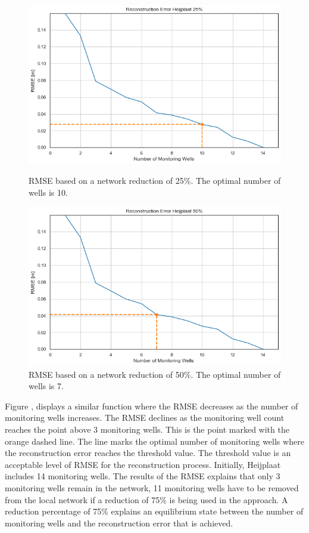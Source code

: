 \begin{figure}[htbp]
    \centering
    \begin{minipage}{0.45\linewidth}
        \includegraphics[width=\linewidth]{frontmatter/Heijplaat-fig/new25.png}
        \caption{RMSE based on a network reduction of 25\%. The optimal number of wells is 10.}
        \label{heij25}
    \end{minipage}
    \hfill
    \begin{minipage}{0.45\linewidth}
        \includegraphics[width=\linewidth]{frontmatter/Heijplaat-fig/new50.png}
        \caption{RMSE based on a network reduction of 50\%. The optimal number of wells is 7.}
        \label{heij50}
    \end{minipage}
\end{figure}
\noindent
Figure , displays a similar function where the RMSE decreases as the number of monitoring wells increases. The RMSE declines as the monitoring well count reaches the point above 3 monitoring wells. This is the point marked with the orange dashed line. The line marks the optimal number of monitoring wells where the reconstruction error reaches the threshold value. The threshold value is an acceptable level of RMSE for the reconstruction process. Initially, Heijplaat includes 14 monitoring wells. The results of the RMSE explains that only 3 monitoring wells remain in the network, 11 monitoring wells have to be removed from the local network if a reduction of 75\% is being used in the approach. A reduction percentage of 75\% explains an equilibrium state between the number of monitoring wells and the reconstruction error that is achieved. 
